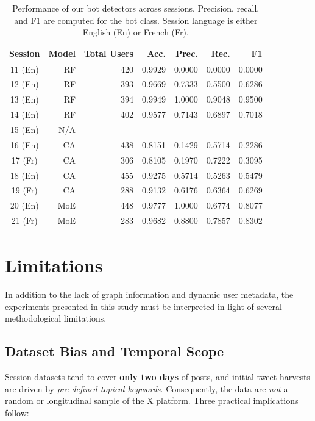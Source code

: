 \documentclass[conference]{IEEEtran}
\begin{document}
\begin{table}[ht]
    \centering
    \begin{tabular}{@{} c r r r r r r @{}}
    \toprule
    Session & Model & Total Users & Acc. & Prec. & Rec. & F1 \\
    \midrule
    11 (En) & RF         & 420 & 0.9929 & 0.0000 & 0.0000 & 0.0000 \\
    12 (En) & RF        & 393 & 0.9669 & 0.7333 & 0.5500 & 0.6286 \\
    13 (En) & RF        & 394 & 0.9949 & 1.0000 & 0.9048 & 0.9500 \\
    14 (En) & RF        & 402 & 0.9577 & 0.7143 & 0.6897 & 0.7018 \\

    15 (En) & N/A      & -- & -- & -- & -- & -- \\

    16 (En) & CA        & 438 & 0.8151 & 0.1429 & 0.5714 & 0.2286 \\
    17 (Fr) & CA        & 306 & 0.8105 & 0.1970 & 0.7222 & 0.3095 \\
    18 (En) & CA        & 455 & 0.9275 & 0.5714 & 0.5263 & 0.5479 \\
    19 (Fr) & CA        & 288 & 0.9132 & 0.6176 & 0.6364 & 0.6269 \\
    20 (En) & MoE        & 448 & 0.9777 & 1.0000 & 0.6774 & 0.8077 \\
    21 (Fr) & MoE        & 283 & 0.9682 & 0.8800 & 0.7857 & 0.8302 \\
    
    \bottomrule
    \end{tabular}
    \caption{Performance of our bot detectors across sessions.
    Precision, recall, and F1 are computed for the bot class.
    Session language is either English (En) or French (Fr).}
    \label{tab:hamzadetector1_results}
    \end{table}


    \section{Limitations}
    \label{sec:limitations}
    In addition to the lack of graph information 
    and dynamic user metadata, the experiments presented in this study
    must be interpreted in light of several methodological
    limitations.
    
    \subsection{Dataset Bias and Temporal Scope}
    Session datasets tend to cover \textbf{only two days} of posts,
    and initial tweet harvests are driven by
    \emph{pre-defined topical keywords}.
    Consequently, the data are \emph{not} a random or
    longitudinal sample of the X platform.
    Three practical implications follow:
    
\end{document}
